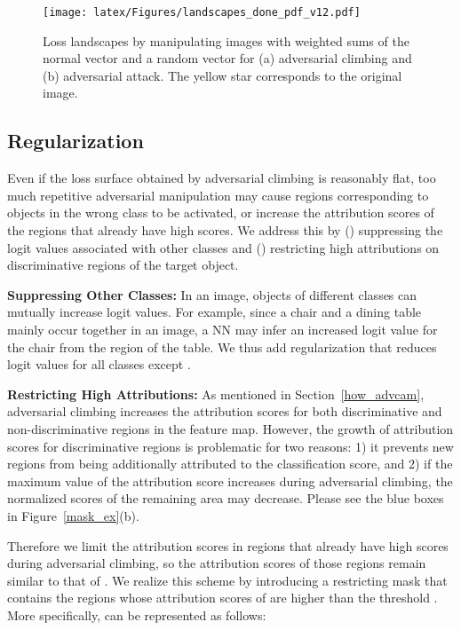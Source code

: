 \documentclass[final]{cvpr}
\begin{document}
\begin{figure}[t]
\centering
\texttt{[image: latex/Figures/landscapes\_done\_pdf\_v12.pdf]}
\vspace{-.7em}
\caption{\label{landscape} Loss landscapes by manipulating images with weighted sums of the normal vector  and a random vector  for (a) adversarial climbing and (b) adversarial attack. The yellow star corresponds to the original image.}
\vspace{-.6em}
\end{figure}
 

\newcommand{\RNum}[1]{\lowercase\expandafter{\romannumeral #1\relax}}


\subsection{Regularization}\label{reg_sec}
Even if the loss surface obtained by adversarial climbing is reasonably flat, too much repetitive adversarial manipulation may cause regions corresponding to objects in the wrong class to be activated, or increase the attribution scores of the regions that already have high scores.
We address this by (\RNum{1}) suppressing the logit values associated with other classes and (\RNum{2}) restricting high attributions on discriminative regions of the target object.

\textbf{Suppressing Other Classes:}
In an image, objects of different classes can mutually increase logit values.
For example, since a chair and a dining table mainly occur together in an image, a NN may infer an increased logit value for the chair from the region of the table.
We thus add regularization that reduces logit values for all classes except .

\textbf{Restricting High Attributions:}
As mentioned in Section~\ref{how_advcam}, adversarial climbing increases the attribution scores for both discriminative and non-discriminative regions in the feature map.
However, the growth of attribution scores for discriminative regions is problematic for two reasons: 1) it prevents new regions from being additionally attributed to the classification score, and 2) if the maximum value of the attribution score increases during adversarial climbing, the normalized scores of the remaining area may decrease. Please see the blue boxes in Figure~\ref{mask_ex}(b).


Therefore we limit the attribution scores in regions that already have high scores during adversarial climbing, so the attribution scores of those regions remain similar to that of .
We realize this scheme by introducing a restricting mask  that contains the regions whose attribution scores of  are higher than the threshold . 
More specifically,  can be represented as follows:
\vspace{-0.1em}
\end{document}
